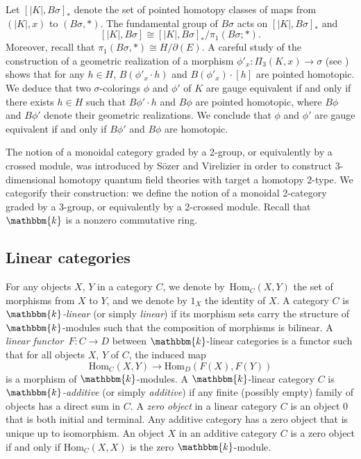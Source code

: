 \documentclass[a4paper, oneside]{amsart}
\makeatletter
\let\origsection\section
\renewcommand\section{\@ifstar{\starsection}{\nostarsection}}
\newcommand\nostarsection[1]
{\sectionprelude\origsection{#1}\sectionpostlude}
\newcommand\starsection[1]
{\sectionprelude\origsection*{#1}\sectionpostlude}
\newcommand\sectionprelude{%
  \vspace{1em}
}
\newcommand\sectionpostlude{%
  \vspace{1em}
}
\numberwithin{equation}{subsection}
\theoremstyle{referencedlemma}
\theoremstyle{plain} %
\theoremstyle{remark}
\makeatother
\begin{document}
Let $[\lvert K\rvert ,B\sigma]_*$ denote the set of pointed homotopy classes of maps from $(\lvert K\rvert , x)$ to $(B\sigma, *)$.  The fundamental group of $B\sigma$ acts on $[\lvert K\rvert,B\sigma]_*$ and
$$
[\lvert K\rvert ,B\sigma] \cong [\lvert K\rvert , B\sigma]_*/\pi_1(B\sigma; *).
$$
Moreover, recall that $\pi_1(B\sigma, *) \cong H/\partial(E)$. A careful study of the construction of a geometric realization of a morphism $\phi'_x \colon \Pi_3(K,x)\to \sigma$ (see \cite[Proposition 9]{ellis_crossed_1993}) shows that for any $h\in H$,  $B(\phi'_x\cdot h)$ and $B(\phi'_x)\cdot [h]$ are pointed homotopic.  We deduce that two $\sigma$-colorings $\phi$ and $\phi'$ of $K$ are gauge equivalent if and only if there exists $h\in H$ such that $B\phi'\cdot h$ and $B\phi$ are pointed homotopic,  where $B\phi$ and $B\phi'$ denote their geometric realizations. We conclude that $\phi$ and $\phi'$ are gauge equivalent if and only if $B\phi'$ and $B\phi$ are homotopic. 

\section{Graded monoidal 2-categories}\label{Section. Graded monoidal 2-categories}

\noindent The notion of a monoidal category graded by a 2-group, or equivalently by a crossed module, was introduced by Sözer and Virelizier \cite{sozer_monoidal_2023, sozer_hopf_2024} in order to construct 3-dimensional homotopy quantum field theories with target a homotopy 2-type. We categorify their construction: we define the notion of a monoidal 2-category graded by a 3-group, or equivalently by a 2-crossed module. Recall that $\mathbbm{k}$ is a nonzero commutative ring. 

\subsection{Linear categories}For any objects $X$, $Y$ in a category $C$, we denote by~$\mathrm{Hom}_C(X,Y)$ the set of morphisms from $X$ to $Y$, and we denote by $1_X$ the identity of $X$.  A category $C$ is \emph{$\mathbbm{k}$-linear} (or simply \emph{linear}) if its morphism sets carry the structure of $\mathbbm{k}$-modules such that the composition of morphisms is bilinear.  A \emph{linear functor}~$F\colon C \to D$ between $\mathbbm{k}$-linear categories is a functor such that for all objects $X$, $Y$ of $C$, the induced map
$$
\mathrm{Hom}_C(X,Y) \to \mathrm{Hom}_D(F(X), F(Y))
$$
is a morphism of $\mathbbm{k}$-modules.  A $\mathbbm{k}$-linear category $C$ is \emph{$\mathbbm{k}$-additive} (or simply \emph{additive}) if any finite (possibly empty) family of objects has a direct sum in $C$.  A \emph{zero object} in a linear category $C$ is an object $0$ that is both initial and terminal.  Any additive category has a zero object that is unique up to isomorphism.  An object $X$ in an additive category $C$ is a zero object if and only if $\mathrm{Hom}_C(X, X)$ is the zero $\mathbbm{k}$-module.  
\end{document}
